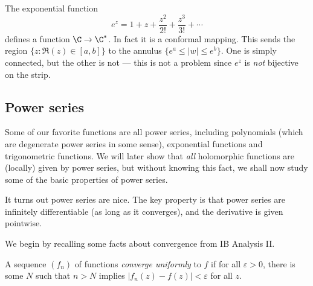 \documentclass[a4paper]{article}
\begin{document}
\begin{eg}
  The exponential function
  \[
    e^z = 1 + z + \frac{z^2}{2!} + \frac{z^3}{3!} + \cdots
  \]
  defines a function $\C \to \C^*$. In fact it is a conformal mapping. This sends the region $\{z: \Re(z) \in [a, b]\}$ to the annulus $\{e^a \leq |w| \leq e^b\}$. One is simply connected, but the other is not --- this is not a problem since $e^z$ is \emph{not} bijective on the strip.
  \begin{center}
  \end{center}
\end{eg}

\subsection{Power series}
Some of our favorite functions are all power series, including polynomials (which are degenerate power series in some sense), exponential functions and trigonometric functions. We will later show that \emph{all} holomorphic functions are (locally) given by power series, but without knowing this fact, we shall now study some of the basic properties of power series.

It turns out power series are nice. The key property is that power series are infinitely differentiable (as long as it converges), and the derivative is given pointwise.

We begin by recalling some facts about convergence from IB Analysis II.
\begin{defi}
  A sequence $(f_n)$ of functions \emph{converge uniformly} to $f$ if for all $\varepsilon > 0$, there is some $N$ such that $n > N$ implies $|f_n(z) - f(z)| < \varepsilon$ for all $z$.
\end{defi}
\end{document}
